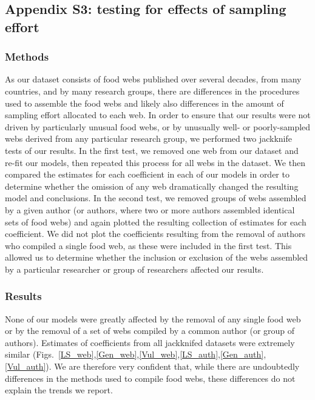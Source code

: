 \documentclass[12pt]{article}
\begin{document}
\newpage

\subsection*{Appendix S3: testing for effects of sampling effort}

  \subsubsection*{Methods}
    As our dataset consists of food webs published over several decades, from 
    many countries, and by many research groups, there are
    differences in the procedures used to assemble the food
    webs and likely also differences in the amount of
    sampling effort allocated to each web. In order to 
    ensure that our results were not driven by
    particularly unusual food webs, or by unusually well- or poorly-sampled webs 
    derived from any particular research group, we performed two jackknife tests of our 
    results. In the first test, we removed one web from our dataset and re-fit 
    our models, then repeated this process for all webs in the dataset. We then 
    compared the estimates for each coefficient in each of our models in order to 
    determine whether the omission of any web dramatically changed the resulting 
    model and conclusions. In the second test, we removed groups of webs assembled by a given 
    author (or authors, where two or more authors assembled identical sets of 
    food webs) and again plotted the resulting collection of estimates for each
    coefficient. We did not plot the coefficients resulting from the removal of
    authors who compiled a single food web, as these were included in the first
    test. This allowed us to determine whether the inclusion or exclusion
    of the webs assembled by a particular researcher or group of researchers
    affected our results.

  \subsubsection*{Results}

    None of our models were greatly affected by the removal of any single food web
    or by the removal of a set of webs compiled by a common author (or group of
    authors).
    Estimates of coefficients from all jackknifed datasets were extremely
    similar (Figs.~\ref{LS_web},\ref{Gen_web},\ref{Vul_web},\ref{LS_auth},\ref{Gen_auth},\ref{Vul_auth}). 
    We are therefore very confident that, while there are undoubtedly differences 
    in the methods used to compile food webs, these differences do not explain the trends we report.
\end{document}

